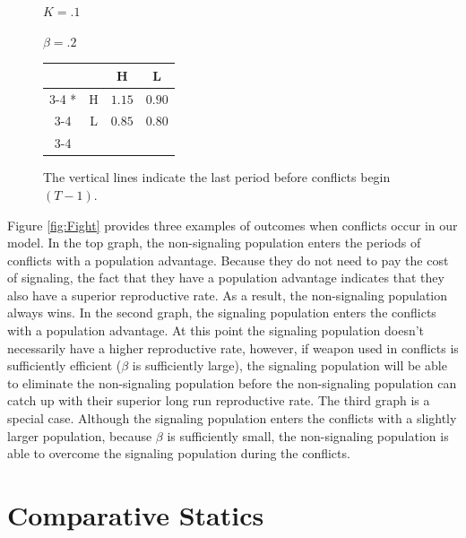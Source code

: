 \begin{figure}[p]
\begin{minipage}[c]{.2\textwidth}
    $K = .1$
    
    $\beta = .2$
    \end{minipage}\hfill
  \begin{minipage}[c]{.3\textwidth}
  \begin{tabular}{cc|c|c|}
      & \multicolumn{1}{c}{} & \multicolumn{1}{c}{H}  & \multicolumn{1}{c}{L} \\\cline{3-4}
      \multirow{2}*{}  & H & $1.15$ & $0.90$ \\\cline{3-4}
      & L & $0.85$ & $0.80$ \\\cline{3-4}
    \end{tabular}
    \end{minipage}\hfill
    \begin{minipage}[c]{.3\textwidth}
    The vertical lines indicate the last period before conflicts begin $(T-1)$.
    \end{minipage}
    \end{figure}

Figure \ref{fig:Fight} provides three examples of outcomes when conflicts occur in our model. In the top graph, the non-signaling population enters the periods of conflicts with a population advantage. Because they do not need to pay the cost of signaling, the fact that they have a population advantage indicates that they also have a superior reproductive rate. As a result, the non-signaling population always wins. In the second graph, the signaling population enters the conflicts with a population advantage. At this point the signaling population doesn't necessarily have a higher reproductive rate, however, if weapon used in conflicts is sufficiently efficient ($\beta$ is sufficiently large), the signaling population will be able to eliminate the non-signaling population before the non-signaling population can catch up with their superior long run reproductive rate. The third graph is a special case. Although the signaling population enters the conflicts with a slightly larger population, because $\beta$ is sufficiently small, the non-signaling population is able to overcome the signaling population during the conflicts.


\section{Comparative Statics}

